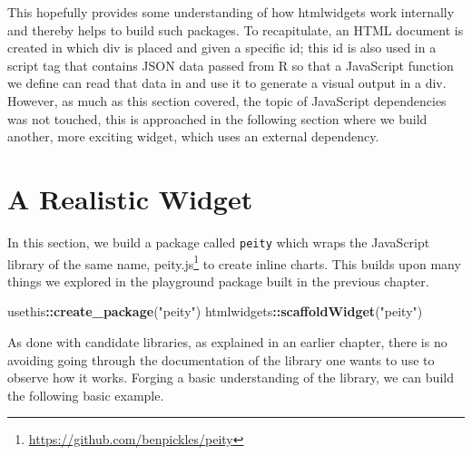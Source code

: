 \documentclass[
]{krantz}
\makeatletter
\newenvironment{Shaded}{\begin{snugshade}}{\end{snugshade}}
\newcommand{\KeywordTok}[1]{\textcolor[rgb]{0.27,0.27,0.27}{\textbf{#1}}}
\newcommand{\NormalTok}[1]{#1}
\newcommand{\OperatorTok}[1]{\textcolor[rgb]{0.43,0.43,0.43}{\textbf{#1}}}
\newcommand{\StringTok}[1]{\textcolor[rgb]{0.5,0.5,0.5}{#1}}
\renewcommand{\href}[2]{#2\footnote{\url{#1}}}
\newenvironment{kframe}{%
\medskip{}
\setlength{\fboxsep}{.8em}
 \def\at@end@of@kframe{}%
 \ifinner\ifhmode%
  \def\at@end@of@kframe{\end{minipage}}%
  \begin{minipage}{\columnwidth}%
 \fi\fi%
 \def\FrameCommand##1{\hskip\@totalleftmargin \hskip-\fboxsep
 \colorbox{shadecolor}{##1}\hskip-\fboxsep
     \hskip-\linewidth \hskip-\@totalleftmargin \hskip\columnwidth}%
 \MakeFramed {\advance\hsize-\width
   \@totalleftmargin\z@ \linewidth\hsize
   \@setminipage}}%
 {\par\unskip\endMakeFramed%
 \at@end@of@kframe}
\renewenvironment{Shaded}{\begin{kframe}}{\end{kframe}}
\makeatother
\begin{document}
This hopefully provides some understanding of how htmlwidgets work internally and thereby helps to build such packages. To recapitulate, an HTML document is created in which div is placed and given a specific id; this id is also used in a script tag that contains JSON data passed from R so that a JavaScript function we define can read that data in and use it to generate a visual output in a div. However, as much as this section covered, the topic of JavaScript dependencies was not touched, this is approached in the following section where we build another, more exciting widget, which uses an external dependency.

\hypertarget{widgets-realistic}{%
\chapter{A Realistic Widget}\label{widgets-realistic}}

In this section, we build a package called \texttt{peity} which wraps the JavaScript library of the same name, \href{https://github.com/benpickles/peity}{peity.js} to create inline charts. This builds upon many things we explored in the playground package built in the previous chapter.

\begin{Shaded}
\begin{Highlighting}[]
\NormalTok{usethis}\OperatorTok{::}\KeywordTok{create\_package}\NormalTok{(}\StringTok{"peity"}\NormalTok{)}
\NormalTok{htmlwidgets}\OperatorTok{::}\KeywordTok{scaffoldWidget}\NormalTok{(}\StringTok{"peity"}\NormalTok{)}
\end{Highlighting}
\end{Shaded}

As done with candidate libraries, as explained in an earlier chapter, there is no avoiding going through the documentation of the library one wants to use to observe how it works. Forging a basic understanding of the library, we can build the following basic example.
\end{document}
